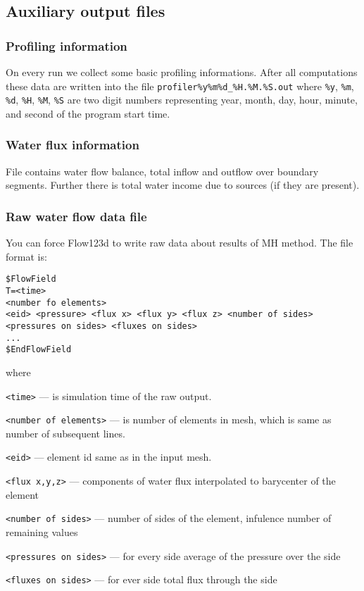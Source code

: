 

\subsection{Auxiliary output files}

\subsubsection{Profiling information}
On every run we collect some basic profiling informations. After all computations these data are written into the file
\verb'profiler%y%m%d_%H.%M.%S.out' where \verb'%y', \verb'%m', \verb'%d', \verb'%H', \verb'%M', \verb'%S' are 
two digit numbers representing year, month, day, hour, minute, and second of the program start time.

\subsubsection{Water flux information}
File contains water flow balance, total inflow and outflow over boundary segments. 
Further there is total water income due to sources (if they are present).


\subsubsection{Raw water flow data file}
You can force Flow123d to write raw data about results of MH method. The file format is:
\begin{verbatim}
$FlowField
T=<time>
<number fo elements>
<eid> <pressure> <flux x> <flux y> <flux z> <number of sides> <pressures on sides> <fluxes on sides> 
...
$EndFlowField
\end{verbatim}

where 
\begin{description}
 \item \verb'<time>' --- is simulation time of the raw output.
 \item \verb'<number of elements>' --- is number of elements in mesh, which is same as number of subsequent lines.
 \item \verb'<eid>' --- element id same as in the input mesh.
 \item \verb'<flux x,y,z>' --- components of water flux interpolated to barycenter of the element
 \item \verb'<number of sides>' --- number of sides of the element, infulence number of remaining values
 \item \verb'<pressures on sides>' --- for every side average of the pressure over the side
 \item \verb'<fluxes on sides>' --- for ever side total flux through the side 
\end{description}

